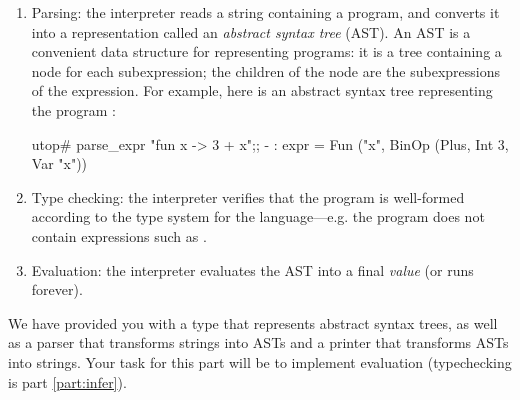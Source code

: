 \documentclass{pset}
\begin{document}
\begin{enumerate}
  \item Parsing: the interpreter reads a string containing a program, and
    converts it into a representation called an \emph{abstract syntax tree}
    (AST).  An AST is a convenient data structure for representing programs: it
    is a tree containing a node for each subexpression; the children of the node
    are the subexpressions of the expression.  For example, here is an abstract
    syntax tree representing the program :

    \begin{center}
    \end{center}
    \begin{ocaml}
    utop# parse_expr "fun x -> 3 + x";;
    - : expr = Fun ("x", BinOp (Plus, Int 3, Var "x"))
    \end{ocaml}

  \item Type checking: the interpreter verifies that the program is
    well-formed according to the type system for the
    language---e.g. the program does not contain expressions such as
    .
  \item Evaluation: the interpreter evaluates the AST into a final
    \emph{value} (or runs forever).
\end{enumerate}

We have provided you with a type  that represents abstract
syntax trees, as well as a parser that transforms strings into ASTs and a
printer that transforms ASTs into strings. Your task for this part will be to
implement evaluation (typechecking is part \ref{part:infer}).
\end{document}
